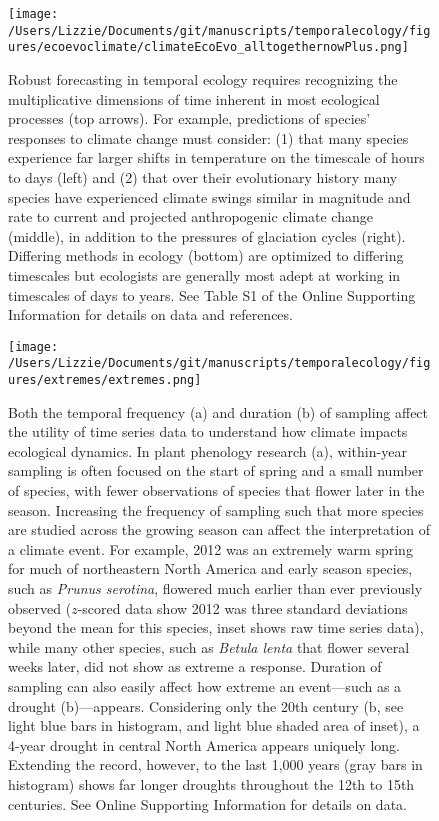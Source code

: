 \documentclass[11pt,a4paper,oneside]{article}
\begin{document}
\newpage
\begin{figure}[h!]
\centering
\noindent \texttt{[image: /Users/Lizzie/Documents/git/manuscripts/temporalecology/figures/ecoevoclimate/climateEcoEvo\_alltogethernowPlus.png]}
\caption{Robust forecasting in temporal ecology requires recognizing the multiplicative dimensions of time inherent in most ecological processes (top arrows). For example, predictions of species' responses to climate change must consider: (1) that many species experience far larger shifts in temperature on the timescale of hours to days (left) and (2) that over their evolutionary history many species have experienced climate swings similar in magnitude and rate to current and projected anthropogenic climate change (middle), in addition to the pressures of glaciation cycles (right). Differing methods in ecology (bottom) are optimized to differing timescales but ecologists are generally most adept at working in timescales of days to years. See Table S1 of the Online Supporting Information for details on data and references.}
\end{figure}

\newpage
\begin{figure}[h!]
\centering
\noindent \texttt{[image: /Users/Lizzie/Documents/git/manuscripts/temporalecology/figures/extremes/extremes.png]}
\caption{Both the temporal frequency (a) and duration (b) of sampling affect the utility of time series data to understand how climate impacts ecological dynamics. In plant phenology research (a), within-year sampling is often focused on the start of spring and a small number of species, with fewer observations of species that flower later in the season. Increasing the frequency of sampling such that more species are studied across the growing season can affect the interpretation of a climate event. For example, 2012 was an extremely warm spring for much of northeastern North America and early season species, such as \emph{Prunus serotina}, flowered much earlier than ever previously observed ($z$-scored data show 2012 was three standard deviations beyond the mean for this species, inset shows raw time series data), while many other species, such as \emph{Betula lenta} that flower several weeks later, did not show as extreme a response. Duration of sampling can also easily affect how extreme an event---such as a drought (b)---appears. Considering only the 20th century (b, see light blue bars in histogram, and light blue shaded area of inset), a 4-year drought in central North America appears uniquely long. Extending the record, however, to the last 1,000 years (gray bars in histogram) shows far longer droughts throughout the 12th to 15th centuries. See Online Supporting Information for details on data.}
\end{figure}
\end{document}
